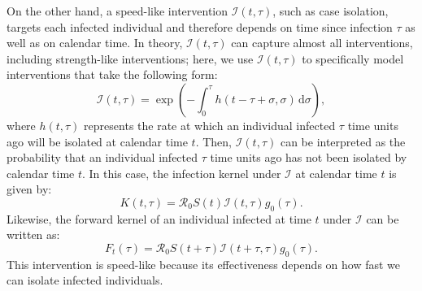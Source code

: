 \documentclass[12pt]{article}
\newcommand{\Rx}[1]{\ensuremath{{\mathcal R}_{#1}}\xspace}
\newcommand{\Ro}{\Rx{0}}
\newcommand{\dd}[1]{\ensuremath{\, \mathrm{d}#1}}
\newcommand{\dsigma}{\dd{\sigma}}
\newcommand{\II}{\ensuremath{\mathcal I}}
\begin{document}
On the other hand, a speed-like intervention $\II(t, \tau)$, such as case isolation, targets each infected individual and therefore depends on time since infection $\tau$ as well as on calendar time.
In theory, $\II(t, \tau)$ can capture almost all interventions, including strength-like interventions; here, we use $\II(t, \tau)$ to specifically model interventions that take the following form:
\begin{equation}
\II(t, \tau) = \exp \left(- \int_0^\tau h(t-\tau+\sigma, \sigma) \dsigma \right),
\end{equation}
where $h(t, \tau)$ represents the rate at which an individual infected $\tau$ time units ago will be isolated at calendar time $t$.
Then, $\II(t,\tau)$ can be interpreted as the probability that an individual infected $\tau$ time units ago has not been isolated by calendar time $t$.
In this case, the infection kernel under $\II$ at calendar time $t$ is given by:
\begin{equation}
K(t, \tau) = \Ro S(t) \II(t, \tau) g_0(\tau).
\end{equation}
Likewise, the forward kernel of an individual infected at time $t$ under $\II$ can be written as:
\begin{equation}
F_t(\tau) = \Ro S(t+\tau) \II(t+\tau, \tau) g_0(\tau).
\end{equation}
This intervention is speed-like because its effectiveness depends on how fast we can isolate infected individuals.
\end{document}
